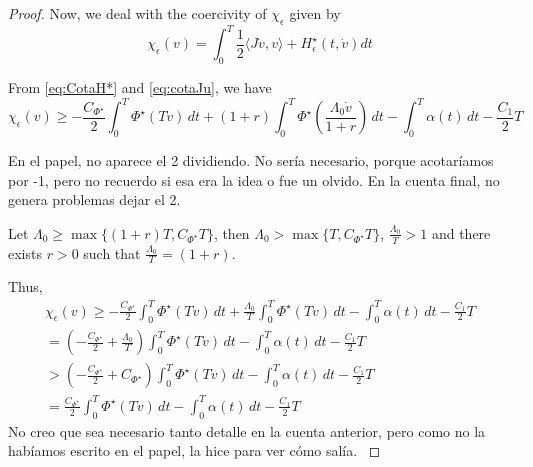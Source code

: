 \documentclass[twoside]{article}
\theoremstyle{remark}
\newcommand{\lpsi}{L^{\Phi^{\star}}}
\newcommand{\rr}{\mathbb{R}}
\renewcommand{\geq}{\geqslant}
\begin{document}
\begin{proof}
%


Now, we deal with the coercivity  of $\chi_{\epsilon}$ given by 
\begin{equation}\label{eq:DualActDelta}
\chi_{\epsilon}(v)=\int_0^T \frac{1}{2} \langle J\dot{v},v\rangle+H_{\epsilon}^{\star}(t,\dot{v})  dt
\end{equation}

From \eqref{eq:CotaH*} and \eqref{eq:cotaJu}, we have
\[
  \chi_{\epsilon}(v)\geq 
	-\frac{C_{\Phi^{\star}}}{2} \int_0^T \Phi^{\star} (T\dot{v})\,dt+(1+r)\int_0^T \Phi^{\star}
	\left(\frac{\Lambda_0 \dot{v}}{1+r}\right)\,dt-\int_0^T \alpha(t)\,dt-\frac{C_1}{2}T
\]

\textcolor[rgb]{1,0,0}{En el papel, no aparece el 2 dividiendo. No ser\'ia necesario, porque acotar\'iamos por -1, pero no recuerdo  
si esa era la idea o fue un olvido. En la cuenta final, no  genera problemas dejar el 2.
}

Let $\Lambda_0 \geq \max \{(1+r)T, C_{\Phi^{\star}}T\}$, then 
$\Lambda_0>\max\{T,C_{\Phi^{\star}}T\}$, $\frac{\Lambda_0}{T}>1$ and there exists $r>0$ such that $\frac{\Lambda_0}{T}=(1+r)$. 

Thus, 
\[
\begin{split}
  \chi_{\epsilon}(v)\geq 
	-\frac{C_{\Phi^{\star}}}{2} \int_0^T \Phi^{\star} (T\dot{v})\,dt+\frac{\Lambda_0}{T}\int_0^T \Phi^{\star}
	\left(T\dot{v}\right)\,dt-\int_0^T \alpha(t)\,dt-\frac{C_1}{2}T
	\\
	=	\left(-\frac{C_{\Phi^{\star}}}{2}+\frac{\Lambda_0}{T}\right) \int_0^T \Phi^{\star} (T\dot{v})\,dt
		-\int_0^T \alpha(t)\,dt-\frac{C_1}{2}T
		\\
		> \left(-\frac{C_{\Phi^{\star}}}{2}+C_{\Phi^{\star}}\right)\int_0^T \Phi^{\star} (T\dot{v})\,dt
		-\int_0^T \alpha(t)\,dt-\frac{C_1}{2}T
		\\
		=\frac{C_{\Phi^{\star}}}{2}\int_0^T \Phi^{\star} (T\dot{v})\,dt
		-\int_0^T \alpha(t)\,dt-\frac{C_1}{2}T
				\end{split}
\]
\textcolor[rgb]{1,0,0}{No creo que sea necesario tanto detalle en la cuenta anterior, 
pero como no la hab\'iamos escrito en el papel, la hice para ver c\'omo sal\'ia.
}
\end{proof}
\end{document}
